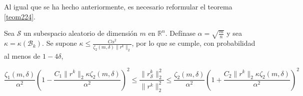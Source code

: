 Al igual que se ha hecho anteriormente, es necesario reformular el teorema \ref{teom224}.

\begin{teorema}
Sea $\mathcal{S}$ un subespacio aleatorio de dimensión $m$ en $\mathbb{R}^n$. Defínase $\alpha = \sqrt{\frac{m}{n}}$ y sea $\kappa = \kappa(\mathcal{B}_k)$. Se supone $\kappa \leq \frac{C \alpha^2}{\zeta_2 (m,\delta) \|r^k \|_2}$, por lo que se cumple, con probabilidad al menos de $1-4\delta$,

$$\frac{\zeta_1 (m,\delta)}{\alpha^2} \left( 1 - \frac{C_1 \|r^k \|_2 \kappa \zeta_2 (m,\delta)}{\alpha^2} \right)^2 \leq \frac{\|r_\mathcal{S}^k \|_2^2}{\|r^k \|_2^2} \leq \frac{\zeta_2 (m,\delta)}{\alpha^2} \left( 1 + \frac{C_2 \|r^k \|_2 \kappa \zeta_2(m,\delta)}{\alpha^2} \right)^2$$
\end{teorema}

